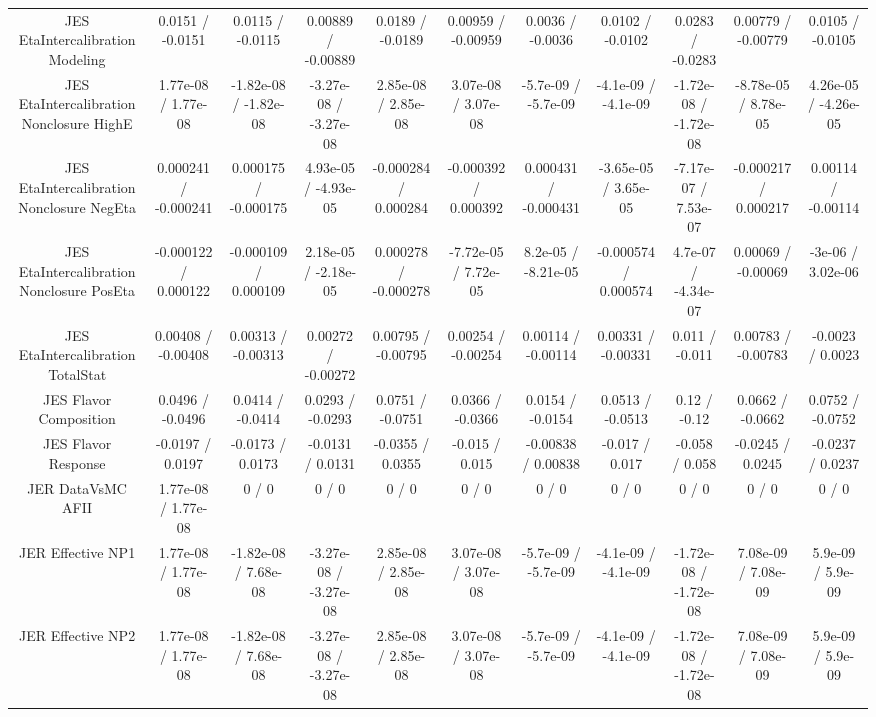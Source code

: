 \begin{table}[htbp]
\begin{center}
\begin{tabular}{|c|c|c|c|c|c|c|c|c|c|c|}
  JES EtaIntercalibration Modeling & 0.0151 / -0.0151 & 0.0115 / -0.0115 & 0.00889 / -0.00889 & 0.0189 / -0.0189 & 0.00959 / -0.00959 & 0.0036 / -0.0036 & 0.0102 / -0.0102 & 0.0283 / -0.0283 & 0.00779 / -0.00779 & 0.0105 / -0.0105 \\ 
  JES EtaIntercalibration Nonclosure HighE & 1.77e-08 / 1.77e-08 & -1.82e-08 / -1.82e-08 & -3.27e-08 / -3.27e-08 & 2.85e-08 / 2.85e-08 & 3.07e-08 / 3.07e-08 & -5.7e-09 / -5.7e-09 & -4.1e-09 / -4.1e-09 & -1.72e-08 / -1.72e-08 & -8.78e-05 / 8.78e-05 & 4.26e-05 / -4.26e-05 \\ 
  JES EtaIntercalibration Nonclosure NegEta & 0.000241 / -0.000241 & 0.000175 / -0.000175 & 4.93e-05 / -4.93e-05 & -0.000284 / 0.000284 & -0.000392 / 0.000392 & 0.000431 / -0.000431 & -3.65e-05 / 3.65e-05 & -7.17e-07 / 7.53e-07 & -0.000217 / 0.000217 & 0.00114 / -0.00114 \\ 
  JES EtaIntercalibration Nonclosure PosEta & -0.000122 / 0.000122 & -0.000109 / 0.000109 & 2.18e-05 / -2.18e-05 & 0.000278 / -0.000278 & -7.72e-05 / 7.72e-05 & 8.2e-05 / -8.21e-05 & -0.000574 / 0.000574 & 4.7e-07 / -4.34e-07 & 0.00069 / -0.00069 & -3e-06 / 3.02e-06 \\ 
  JES EtaIntercalibration TotalStat & 0.00408 / -0.00408 & 0.00313 / -0.00313 & 0.00272 / -0.00272 & 0.00795 / -0.00795 & 0.00254 / -0.00254 & 0.00114 / -0.00114 & 0.00331 / -0.00331 & 0.011 / -0.011 & 0.00783 / -0.00783 & -0.0023 / 0.0023 \\ 
  JES Flavor Composition & 0.0496 / -0.0496 & 0.0414 / -0.0414 & 0.0293 / -0.0293 & 0.0751 / -0.0751 & 0.0366 / -0.0366 & 0.0154 / -0.0154 & 0.0513 / -0.0513 & 0.12 / -0.12 & 0.0662 / -0.0662 & 0.0752 / -0.0752 \\ 
  JES Flavor Response & -0.0197 / 0.0197 & -0.0173 / 0.0173 & -0.0131 / 0.0131 & -0.0355 / 0.0355 & -0.015 / 0.015 & -0.00838 / 0.00838 & -0.017 / 0.017 & -0.058 / 0.058 & -0.0245 / 0.0245 & -0.0237 / 0.0237 \\ 
  JER DataVsMC AFII & 1.77e-08 / 1.77e-08 & 0 / 0 & 0 / 0 & 0 / 0 & 0 / 0 & 0 / 0 & 0 / 0 & 0 / 0 & 0 / 0 & 0 / 0 \\ 
  JER Effective NP1 & 1.77e-08 / 1.77e-08 & -1.82e-08 / 7.68e-08 & -3.27e-08 / -3.27e-08 & 2.85e-08 / 2.85e-08 & 3.07e-08 / 3.07e-08 & -5.7e-09 / -5.7e-09 & -4.1e-09 / -4.1e-09 & -1.72e-08 / -1.72e-08 & 7.08e-09 / 7.08e-09 & 5.9e-09 / 5.9e-09 \\ 
  JER Effective NP2 & 1.77e-08 / 1.77e-08 & -1.82e-08 / 7.68e-08 & -3.27e-08 / -3.27e-08 & 2.85e-08 / 2.85e-08 & 3.07e-08 / 3.07e-08 & -5.7e-09 / -5.7e-09 & -4.1e-09 / -4.1e-09 & -1.72e-08 / -1.72e-08 & 7.08e-09 / 7.08e-09 & 5.9e-09 / 5.9e-09 \\ 

\end{tabular}
\end{center}
\end{table}
